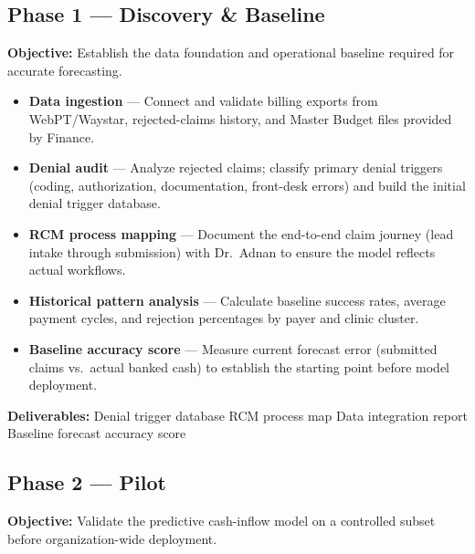 \documentclass[11pt,a4paper]{article}
\begin{document}
\subsection{Phase 1 --- Discovery \& Baseline}

\textbf{Objective:} Establish the data foundation and operational baseline required
for accurate forecasting.

\begin{tcolorbox}[infobox,title={Activities}]
\begin{itemize}
  \item \textbf{Data ingestion} --- Connect and validate billing exports from WebPT/Waystar,
        rejected-claims history, and Master Budget files provided by Finance.
  \item \textbf{Denial audit} --- Analyze rejected claims; classify primary denial
        triggers (coding, authorization, documentation, front-desk errors) and build the
        initial denial trigger database.
  \item \textbf{RCM process mapping} --- Document the end-to-end claim journey (lead intake
        through submission) with Dr.\ Adnan to ensure the model reflects actual workflows.
  \item \textbf{Historical pattern analysis} --- Calculate baseline success rates, average
        payment cycles, and rejection percentages by payer and clinic cluster.
  \item \textbf{Baseline accuracy score} --- Measure current forecast error (submitted claims
        vs.\ actual banked cash) to establish the starting point before model deployment.
\end{itemize}
\end{tcolorbox}

\textbf{Deliverables:} Denial trigger database \textbullet{} RCM process map
\textbullet{} Data integration report \textbullet{} Baseline forecast accuracy score

\subsection{Phase 2 --- Pilot}

\textbf{Objective:} Validate the predictive cash-inflow model on a controlled subset before
organization-wide deployment.
\end{document}
